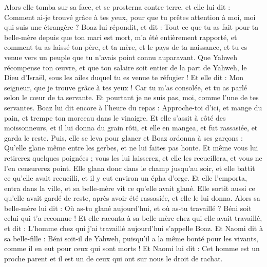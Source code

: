 \begin{multicols}{2}
Alors elle tomba sur sa face, et se prosterna contre terre, et elle lui dit : Comment ai-je trouvé grâce à tes yeux, pour que tu prêtes attention à moi, moi qui suis une étrangère ?
Boaz lui répondit, et dit : Tout ce que tu as fait pour ta belle-mère depuis que ton mari est mort, m'a été entièrement rapporté, et comment tu as laissé ton père, et ta mère, et le pays de ta naissance, et tu es venue vers un peuple que tu n'avais point connu auparavant.
Que Yahweh récompense ton œuvre, et que ton salaire soit entier de la part de Yahweh, le Dieu d'Israël, sous les ailes duquel tu es venue te réfugier !
Et elle dit : Mon seigneur, que je trouve grâce à tes yeux ! Car tu m'as consolée, et tu as parlé selon le cœur de ta servante. Et pourtant je ne suis pas, moi, comme l'une de tes servantes.
Boaz lui dit encore à l'heure du repas : Approche-toi d'ici, et mange du pain, et trempe ton morceau dans le vinaigre. Et elle s'assit à côté des moissonneurs, et il lui donna du grain rôti, et elle en mangea, et fut rassasiée, et garda le reste.
Puis, elle se leva pour glaner et Boaz ordonna à ses garçons : Qu'elle glane même entre les gerbes, et ne lui faites pas honte.
Et même vous lui retirerez quelques poignées ; vous les lui laisserez, et elle les recueillera, et vous ne l'en censurerez point.
Elle glana donc dans le champ jusqu'au soir, et elle battit ce qu'elle avait recueilli, et il y eut environ un épha d'orge.
Et elle l'emporta, entra dans la ville, et sa belle-mère vit ce qu'elle avait glané. Elle sortit aussi ce qu'elle avait gardé de reste, après avoir été rassasiée, et elle le lui donna.
Alors sa belle-mère lui dit : Où as-tu glané aujourd'hui, et où as-tu travaillé ? Béni soit celui qui t'a reconnue ! Et elle raconta à sa belle-mère chez qui elle avait travaillé, et dit : L'homme chez qui j'ai travaillé aujourd'hui s'appelle Boaz.
Et Naomi dit à sa belle-fille : Béni soit-il de Yahweh, puisqu'il a la même bonté pour les vivants, comme il en eut pour ceux qui sont morts ! Et Naomi lui dit : Cet homme est un proche parent et il est un de ceux qui ont sur nous le droit de rachat.

\end{multicols}
